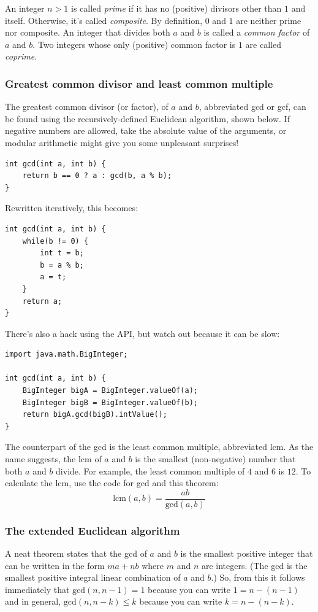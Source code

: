 \documentclass[a4paper,12pt]{article}
\begin{document}
An integer $n>1$ is called {\em prime} if it has no (positive) divisors other than $1$ and itself. Otherwise, it's called {\em composite}. By definition, $0$ and $1$ are neither prime nor composite. An integer that divides both $a$ and $b$ is called a {\em common factor} of $a$ and $b$. Two integers whose only (positive) common factor is $1$ are called {\em coprime}.

\subsubsection{Greatest common divisor and least common multiple}

\noindent The greatest common divisor (or factor), of $a$ and $b$, abbreviated gcd or gcf, can be found using the recursively-defined Euclidean algorithm, shown below. If negative numbers are allowed, take the absolute value of the arguments, or modular arithmetic might give you some unpleasant surprises!

\begin{lstlisting}
int gcd(int a, int b) {
	return b == 0 ? a : gcd(b, a % b);
}
\end{lstlisting}

\noindent Rewritten iteratively, this becomes:

\begin{lstlisting}
int gcd(int a, int b) {
	while(b != 0) {
		int t = b;
		b = a % b;
		a = t;
	}
	return a;
}
\end{lstlisting}

\noindent There's also a hack using the API, but watch out because it can be slow:

\begin{lstlisting}
import java.math.BigInteger;

int gcd(int a, int b) {
	BigInteger bigA = BigInteger.valueOf(a);
	BigInteger bigB = BigInteger.valueOf(b);
	return bigA.gcd(bigB).intValue();
}
\end{lstlisting}

The counterpart of the gcd is the least common multiple, abbreviated lcm. As the name suggests, the lcm of $a$ and $b$ is the smallest (non-negative) number that both $a$ and $b$ divide. For example, the least common multiple of $4$ and $6$ is $12$. To calculate the lcm, use the code for gcd and this theorem:
\[\mathrm{lcm}(a,b) = \frac{ab}{\mathrm{gcd}(a,b)}\]

\subsubsection{The extended Euclidean algorithm}
A neat theorem states that the gcd of $a$ and $b$ is the smallest positive integer that can be written in the form $ma+nb$ where $m$ and $n$ are integers. (The gcd is the smallest positive integral linear combination of $a$ and $b$.) So, from this it follows immediately that $\mathrm{gcd}(n,n-1)=1$ because you can write $1=n-(n-1)$ and in general, $\mathrm{gcd}(n,n-k)\le k$ because you can write $k=n-(n-k)$.
\end{document}
